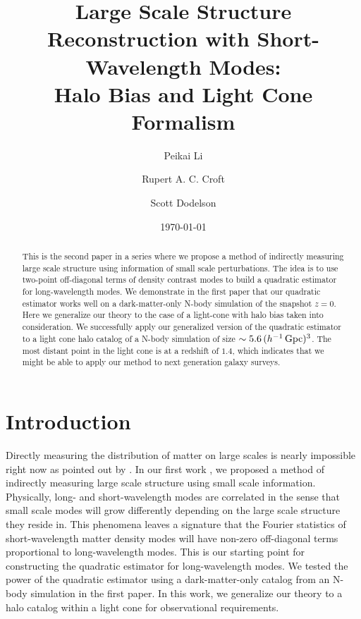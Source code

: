 \documentclass[prd,amsmath,amssymb,floatfix,superscriptaddress,nofootinbib,twocolumn]{revtex4-1}
\begin{document}
\title{Large Scale Structure Reconstruction with Short-Wavelength Modes: \\Halo Bias and Light Cone Formalism}
\author{\large Peikai Li}
\author{\large Rupert A. C. Croft}
\author{\large Scott Dodelson}

\date{\today}
\begin{abstract}
\noindent This is the second paper in a series where we propose a method of indirectly measuring large scale structure using information of small scale perturbations. The idea is to use two-point off-diagonal terms of density contrast modes to build a quadratic estimator for long-wavelength modes. We demonstrate in the first paper that our quadratic estimator works well on a dark-matter-only N-body simulation of the snapshot $z=0$. Here we generalize our theory to the case of a light-cone with halo bias taken into consideration. We successfully apply our generalized version of the quadratic estimator to a light cone halo catalog of a N-body simulation of size $\sim5.6\,(h^{-1}\,\rm Gpc)^3$. The most distant point in the light cone is at a redshift of $1.4$, which indicates that we might be able to apply our method to next generation galaxy surveys.
\end{abstract}
\maketitle
\section{Introduction} \label{sec1}
\noindent Directly measuring the distribution of matter on large scales is nearly impossible right now as pointed out by \cite{Modi:2019hydr}. In our first work \cite{Li:2020fir}, we proposed a method of indirectly measuring large scale structure using small scale information. Physically, long- and short-wavelength modes are correlated in the sense that small scale modes will grow differently depending on the large scale structure they reside in. This phenomena leaves a signature that the Fourier statistics of short-wavelength matter density modes will have non-zero off-diagonal terms proportional to long-wavelength modes. This is our starting point for constructing the quadratic estimator for long-wavelength modes. We tested the power of the quadratic estimator using a dark-matter-only catalog from an N-body simulation in the first paper. In this work, we generalize our theory to a halo catalog within a light cone for observational requirements.
\end{document}
